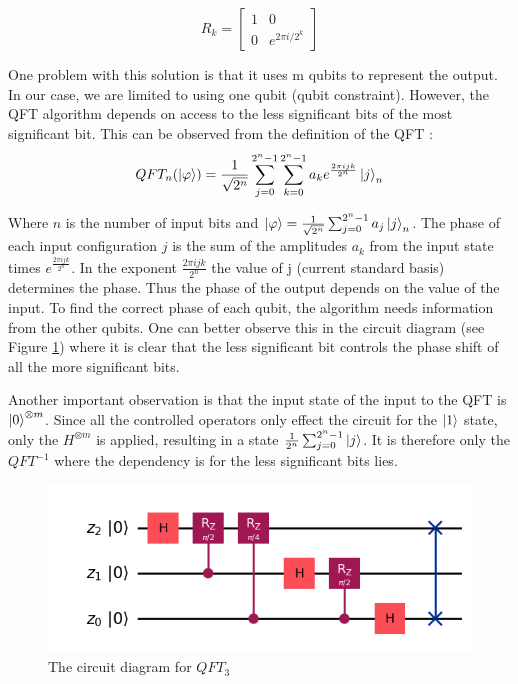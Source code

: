 \documentclass[12pt,a4paper]{article}
\begin{document}
\[
    R_k = 
    \begin{bmatrix}
        1 & 0 \\
        0 & e^{2\pi i/2^k}
    \end{bmatrix}
\]

One problem with this solution is that it uses m qubits to represent the output. In our case, we are limited to using one qubit (qubit constraint). However, the QFT algorithm depends on access to the less significant bits of the most significant bit. This can be observed from the definition of the QFT \cite[p. 363]{sutor_dancing_2019}: 
\[
    QFT_n(\ket{\varphi}) = \frac{1}{\sqrt{2^n}} \sum^{2^n-1}_{j=0} \sum^{2^n-1}_{k=0} a_k e^\frac{2 \pi i j k}{2^n} \ket{j}_n
\]

Where \(n\) is the number of input bits and \(\ket{\varphi} = \frac{1}{\sqrt{2^n}} \sum^{2^n-1}_{j=0} a_j \ket{j}_n\). The phase of each input configuration \(j\) is the sum of the amplitudes \(a_k\) from the input state times \(e^\frac{2 \pi i j k}{2^n}\). In the exponent \(\frac{2 \pi i j k}{2^n}\) the value of j (current standard basis) determines the phase. Thus the phase of the output depends on the value of the input. To find the correct phase of each qubit, the algorithm needs information from the other qubits. One can better observe this in the circuit diagram (see Figure \ref{fig:qft_3}) where it is clear that the less significant bit controls the phase shift of all the more significant bits. 

Another important observation is that the input state of the input to the QFT is \(\ket{0}^{\otimes m}\). Since all the controlled operators only effect the circuit for the \(\ket{1}\) state, only the \(H^{\otimes m}\) is applied, resulting in a state \(\frac{1}{2^n} \sum^{2^n-1}_{j=0} \ket{j}\). It is therefore only the \(QFT^{-1}\) where the dependency is for the less significant bits lies. 

\begin{figure}[htbp] 
    \centering \includegraphics[width=1\textwidth]{Figures/qft_3_figure.png} 
    \caption{The circuit diagram for $QFT_3$} 
    \label{fig:qft_3} 
\end{figure}
\end{document}
